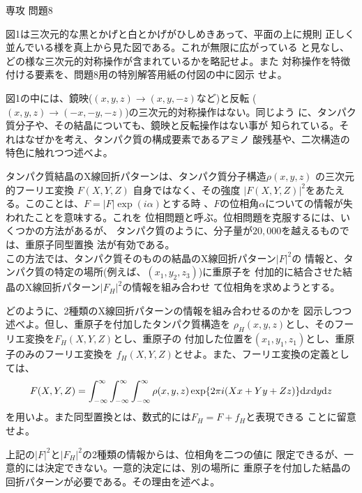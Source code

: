 \documentclass[fleqn]{jbook}
\begin{document}
\begin{question}{専攻 問題8}{}

\begin{subquestions}
\SubQuestion
  図1は三次元的な黒とかげと白とかげがひしめきあって、平面の上に規則
  正しく並んでいる様を真上から見た図である。これが無限に広がっている
  と見なし、どの様な三次元的対称操作が含まれているかを略記せよ。また
  対称操作を特徴付ける要素を、問題8用の特別解答用紙の付図の中に図示
  せよ。

\SubQuestion
  図1の中には、鏡映($(x,y,z)\rightarrow(x,y,-z)$など)と反転
  ($(x,y,z)\rightarrow(-x,-y,-z)$)の三次元的対称操作はない。同じよう
  に、タンパク質分子や、その結晶についても、鏡映と反転操作はない事が
  知られている。それはなぜかを考え、タンパク質の構成要素であるアミノ
  酸残基や、二次構造の特色に触れつつ述べよ。

\SubQuestion
  タンパク質結晶のX線回折パターンは、タンパク質分子構造$\rho(x,y,z)$
  の三次元的フーリエ変換 $F(X,Y,Z)$ 自身ではなく、その強度
  $|F(X,Y,Z)|^2$をあたえる。このことは、$F=|F|\exp(i\alpha)$とする時
  、$F$の位相角$\alpha$についての情報が失われたことを意味する。これを
  位相問題と呼ぶ。位相問題を克服するには、いくつかの方法があるが、
  タンパク質のように、分子量が$20,000$を越えるものでは、重原子同型置換
  法が有効である。\\
  この方法では、タンパク質そのものの結晶のX線回折パターン$|F|^2$の
  情報と、タンパク質の特定の場所(例えば、$(x_1,y_2,z_3)$)に重原子を
  付加的に結合させた結晶のX線回折パターン$|F_H|^2$の情報を組み合わせ
  て位相角を求めようとする。

  \begin{subsubquestions}
  \SubSubQuestion
    どのように、2種類のX線回折パターンの情報を組み合わせるのかを
    図示しつつ述べよ。但し、重原子を付加したタンパク質構造を
    $\rho_H(x,y,z)$とし、そのフーリエ変換を$F_H(X,Y,Z)$とし、重原子の
    付加した位置を$(x_1,y_1,z_1)$とし、重原子のみのフーリエ変換を
    $f_H(X,Y,Z)$とせよ。また、フーリエ変換の定義としては、
%
    \[ F(X,Y,Z) = \int_{-\infty}^{\infty} \int_{-\infty}^{\infty}%
                  \int_{-\infty}^{\infty}%
                  \rho(x,y,z)\exp\{2\pi i(Xx+Yy+Zz)\}\d{x}\d{y}\d{z}\]
%
    を用いよ。また同型置換とは、数式的には$F_H = F + f_H$と表現できる
    ことに留意せよ。


  \SubSubQuestion
    上記の$|F|^2$と$|F_H|^2$の2種類の情報からは、位相角を二つの値に
    限定できるが、一意的には決定できない。一意的決定には、別の場所に
    重原子を付加した結晶の回折パターンが必要である。その理由を述べよ。


\end{subsubquestions}
\end{subquestions}
\end{question}
\end{document}
